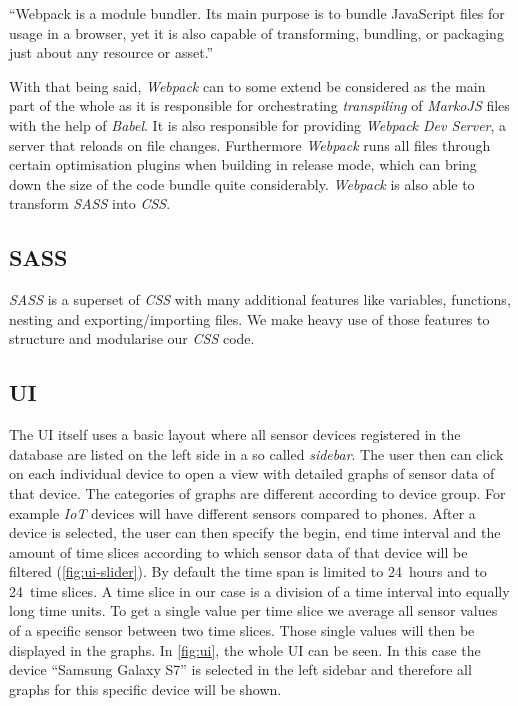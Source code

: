 “Webpack is a module bundler. Its main purpose is to bundle JavaScript files for usage in a browser,
yet it is also capable of transforming, bundling, or packaging just about any resource or asset.”
\cite{webpack}

With that being said, \textit{Webpack} can to some extend be considered as the main part of the whole
 as it is responsible for orchestrating \textit{transpiling} of
\textit{MarkoJS} files with the help of \textit{Babel}. It is also responsible for providing
\textit{Webpack Dev Server}, a server that reloads on file changes. Furthermore \textit{Webpack} runs
all files through certain optimisation plugins when building in release mode, which can bring down the size of
the code bundle quite considerably. \textit{Webpack} is also able to transform
\textit{SASS} into \textit{CSS}.

\subsection{SASS}

\textit{SASS} \cite{sass} is a superset of \textit{CSS} with many additional features like
variables, functions, nesting and exporting/importing files. We make heavy use of those features to
structure and modularise our \textit{CSS} code.

\subsection{UI}
\label{sec:ui}

The UI itself uses a basic layout where all sensor devices registered in the database are listed
on the left side in a so called \textit{sidebar}. The user then can click on each individual device to
open a view with detailed graphs of sensor data of that device. The categories of graphs are
different according to device group. For example \textit{IoT} devices will have different sensors
compared to phones. After a device is selected, the user can then specify the begin, end time
interval and the amount of time slices according to which sensor data of that device will be
filtered (\autoref{fig:ui-slider}). By default the time span is limited to 24~hours and to 24~time slices. A time slice in our
case is a division of a time interval into equally long time units. To get a single value per time
slice we average all sensor values of a specific sensor between two time slices. Those single values
will then be displayed in the graphs. In \autoref{fig:ui}, the whole UI can be seen. In this case the device “Samsung Galaxy S7” is
selected in the left sidebar and therefore all graphs for this specific device will be shown.

